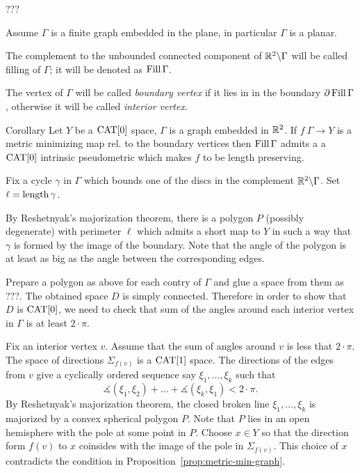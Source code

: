 \documentclass[a4paper,10pt]{amsart}
\begin{document}
???\qeds

Assume $\Gamma$ is a finite graph embedded in the plane,
in particular $\Gamma$ is a planar.

The complement to the unbounded connected component of $\mathbb{R}^2\backslash\Gamma$ will be called filling of $\Gamma$;
it will be denoted as $\mathop{\rm Fill}\Gamma$.

The vertex of $\Gamma$ will be called \emph{boundary vertex}
if it lies in in the boundary $\partial\mathop{\rm Fill}\Gamma$,
otherwise it will be called \emph{interior vertex}.

\begin{thm}{Corollary}
Let $Y$ be a $\mathop{\rm CAT}\nolimits[0]$ space,
$\Gamma$ is a graph embedded in $\mathbb{R}^2$.
If $f\:\Gamma\to Y$ is a metric minimizing map rel. to the boundary vertices 
then $\mathop{\rm Fill}\Gamma$ admits a 
a $\mathop{\rm CAT}\nolimits[0]$ intrinsic pseudometric which makes $f$ to be length preserving.
\end{thm}

Fix a cycle $\gamma$ in $\Gamma$ which bounds one of the discs in the complement $\mathbb{R}^2\backslash \Gamma$.
Set $\ell=\mathop{\rm length}\nolimits\gamma$.

By Reshetnyak's majorization theorem, there is a polygon $P$ (possibly degenerate) with perimeter $\ell$ which admits a short map to $Y$ in such a way that $\gamma$ is formed by the image of the boundary.
Note that the angle of the polygon is at least as big as the angle between the corresponding edges.

Prepare a polygon as above for each contry of $\Gamma$
and glue a space from them as ???.
The obtained space $D$ is simply connected.
Therefore in order to show that $D$ is $\mathop{\rm CAT}\nolimits[0]$,
we need to check that sum of the angles around each interior vertex in $\Gamma$ is at least $2\cdot\pi$.

Fix an interior vertex $v$.
Assume that the sum of angles around $v$ is less that $2\cdot\pi$.
The space of directions $\Sigma_{f(v)}$ is a $\mathop{\rm CAT}\nolimits[1]$ space.
The directions of the edges from $v$ give a cyclically ordered sequence say $\xi_1,\dots,\xi_k$
such that
\[\measuredangle(\xi_1,\xi_2)+\dots+\measuredangle(\xi_k,\xi_1)<2\cdot\pi.\]
By Reshetnyak's majorization theorem,
the closed broken line $\xi_1,\dots,\xi_k$ is majorized by a convex spherical polygon $P$.
Note that $P$ lies in an open hemisphere with the pole  at some point in $P$.
Choose $x\in Y$ so that the direction form $f(v)$ to $x$ coinsides with the image of the pole in $\Sigma_{f(v)}$.
This choice of $x$ contradicts the condition in Proposition~\ref{prop:metric-min-graph}.\qeds
\end{document}
